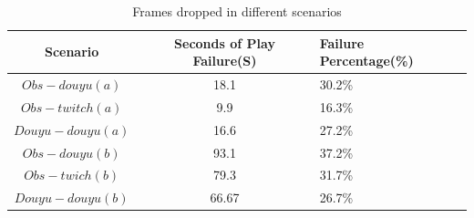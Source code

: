 \begin{table}[tb]
\centering
\caption{Frames dropped in different scenarios}
\label{tbl:drop}
{\setlength{\tabcolsep}{1pt}
\begin{tabular}{|c|c|l|}
\hline
\textbf{Scenario} & \textbf{Seconds of Play Failure(S)} & \textbf{ Failure Percentage(\%)}   \\ \hline
$Obs-douyu(a)$               & 18.1         & 30.2\%                           \\ \hline
$Obs-twitch(a)$              & 9.9        & 16.3\%                            \\ \hline
$Douyu-douyu(a)$             & 16.6      & 27.2\% \\ \hline
$Obs-douyu(b)$            & 93.1      & 37.2\%     \\ \hline
$Obs-twich(b)$             & 79.3      & 31.7\%  \\ \hline
$Douyu-douyu(b)$              & 66.67         & 26.7\%  \\ \hline
\end{tabular}}
\end{table} 